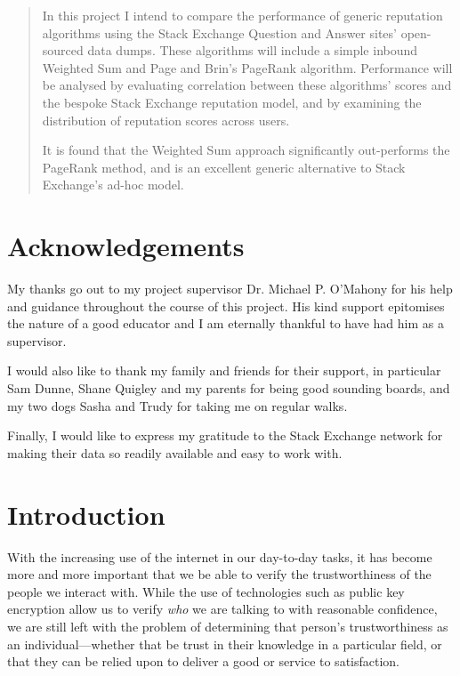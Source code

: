 \documentclass[]{final_report}
\begin{document}
\begin{abstract}

In this project I intend to compare the performance of generic reputation algorithms using the Stack Exchange Question and Answer sites' open-sourced data dumps. These algorithms will include a simple inbound Weighted Sum and Page and Brin's PageRank algorithm. Performance will be analysed by evaluating correlation between these algorithms' scores and the bespoke Stack Exchange reputation model, and by examining the distribution of reputation scores across users.

It is found that the Weighted Sum approach significantly out-performs the PageRank method, and is an excellent generic alternative to Stack Exchange's ad-hoc model.


\end{abstract}
\newpage

\chapter*{Acknowledgements}

My thanks go out to my project supervisor Dr. Michael P. O'Mahony  for his help and guidance throughout the course of this project. His kind support epitomises the nature of a good educator and I am eternally thankful to have had him as a supervisor. 

I would also like to thank my family and friends for their support, in particular Sam Dunne, Shane Quigley and my parents for being good sounding boards, and my two dogs Sasha and Trudy for taking me on regular walks. 

Finally, I would like to express my gratitude to the Stack Exchange network for making their data so readily available and easy to work with.

\tableofcontents{}\newpage


\chapter{Introduction}

With the increasing use of the internet in our day-to-day tasks, it has become more and more important that we be able to verify the trustworthiness of the people we interact with. While the use of technologies such as public key encryption allow us to verify \textsl{who} we are talking to with reasonable confidence, we are still left with the problem of determining that person's trustworthiness as an individual---whether that be trust in their knowledge in a particular field, or that they can be relied upon to deliver a good or service to satisfaction.
\end{document}
